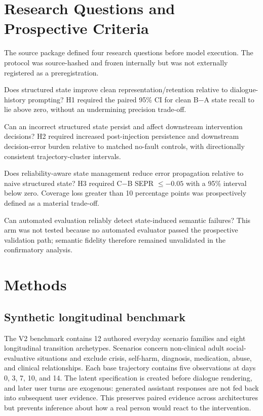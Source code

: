 \documentclass[10pt]{article}
\begin{document}
\section{Research Questions and Prospective Criteria}
The source package defined four research questions before model execution. The protocol was source-hashed and frozen internally but was not externally registered as a preregistration.

\begin{description}[leftmargin=0.5cm,style=nextline]
\item[RQ1/H1.] Does structured state improve clean representation/retention relative to dialogue-history prompting? H1 required the paired 95\% CI for clean B$-$A state recall to lie above zero, without an undermining precision trade-off.
\item[RQ2/H2.] Can an incorrect structured state persist and affect downstream intervention decisions? H2 required increased post-injection persistence and downstream decision-error burden relative to matched no-fault controls, with directionally consistent trajectory-cluster intervals.
\item[RQ3/H3.] Does reliability-aware state management reduce error propagation relative to naive structured state? H3 required C$-$B SEPR $\leq -0.05$ with a 95\% interval below zero. Coverage loss greater than 10 percentage points was prospectively defined as a material trade-off.
\item[RQ4/H4.] Can automated evaluation reliably detect state-induced semantic failures? This arm was not tested because no automated evaluator passed the prospective validation path; semantic fidelity therefore remained unvalidated in the confirmatory analysis.
\end{description}

\section{Methods}
\subsection{Synthetic longitudinal benchmark}
The V2 benchmark contains 12 authored everyday scenario families and eight longitudinal transition archetypes. Scenarios concern non-clinical adult social-evaluative situations and exclude crisis, self-harm, diagnosis, medication, abuse, and clinical relationships. Each base trajectory contains five observations at days 0, 3, 7, 10, and 14. The latent specification is created before dialogue rendering, and later user turns are exogenous: generated assistant responses are not fed back into subsequent user evidence. This preserves paired evidence across architectures but prevents inference about how a real person would react to the intervention.
\end{document}
